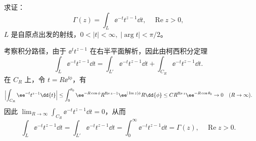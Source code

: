 \begin{question}
求证：
\[
\Gamma(z)=\int_L \ee^{-t} t^{z-1}\dd{t},\quad \operatorname{Re} z>0,
\]
\(L\) 是自原点出发的射线，\(0<|t|<\infty,\;|\arg t|<\pi/2\)。

\begin{solution}
\begin{center}
\end{center}
考察积分路径，由于 \(\ee^t t^{z-1}\) 在右半平面解析，因此由柯西积分定理
\[
\int_L \ee^{-t} t^{z-1}\dd{t}
= \int_{L'} \ee^{-t} t^{z-1}\dd{t} + \int_{C_R} \ee^{-t} t^{z-1}\dd{t}.
\]
在 \(C_R\) 上，令 \(t=R\ee^{\ii\phi}\)，有
\[
\Bigl|\int_{C_R} \ee^{-t} t^{z-1}\dd{t}\Bigr|
\le \int_{0}^{\theta_0} \ee^{-R\cos\phi} R^{\operatorname{Re}z-1} \ee^{|\operatorname{Im}z|\phi} R\dd{\phi}
\le C R^{\operatorname{Re}z} \ee^{-R\cos\theta_0} \to 0 \quad (R\to\infty).
\]
因此 \(\displaystyle\lim_{R\to\infty}\int_{C_R} \ee^{-t} t^{z-1}\dd{t}=0\)，从而
\[
\int_L \ee^{-t} t^{z-1}\dd{t} = \int_{L'} \ee^{-t} t^{z-1}\dd{t}
= \int_0^\infty \ee^{-t} t^{z-1}\dd{t} = \Gamma(z),\quad \operatorname{Re}z>0.
\]
\end{solution}
\end{question}
